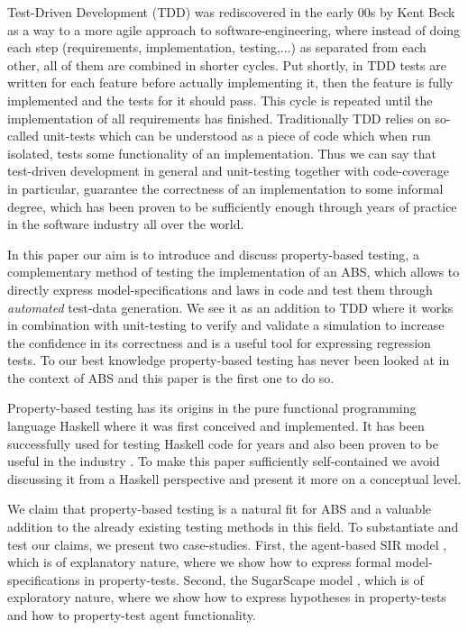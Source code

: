 Test-Driven Development (TDD) was rediscovered in the early 00s by Kent Beck \cite{beck_test_2002} as a way to a more agile approach to software-engineering, where instead of doing each step (requirements, implementation, testing,...) as separated from each other, all of them are combined in shorter cycles. Put shortly, in TDD tests are written for each feature before actually implementing it, then the feature is fully implemented and the tests for it should pass. This cycle is repeated until the implementation of all requirements has finished. Traditionally TDD relies on so-called unit-tests which can be understood as a piece of code which when run isolated, tests some functionality of an implementation. Thus we can say that test-driven development in general and unit-testing together with code-coverage in particular, guarantee the correctness of an implementation to some informal degree, which has been proven to be sufficiently enough through years of practice in the software industry all over the world. 

In this paper our aim is to introduce and discuss property-based testing, a complementary method of testing the implementation of an ABS, which allows to directly express model-specifications and laws in code and test them through \textit{automated} test-data generation. We see it as an addition to TDD where it works in combination with unit-testing to verify and validate a simulation to increase the confidence in its correctness and is a useful tool for expressing regression tests. To our best knowledge property-based testing has never been looked at in the context of ABS and this paper is the first one to do so.

Property-based testing has its origins \cite{claessen_quickcheck_2000,claessen_testing_2002,runciman_smallcheck_2008} in the pure functional programming language Haskell \cite{hudak_history_2007} where it was first conceived and implemented. It has been successfully used for testing Haskell code for years and also been proven to be useful in the industry \cite{hughes_quickcheck_2007}. To make this paper sufficiently self-contained we avoid discussing it from a Haskell perspective and present it more on a conceptual level. 

We claim that property-based testing is a natural fit for ABS and a valuable addition to the already existing testing methods in this field. To substantiate and test our claims, we present two case-studies. First, the agent-based SIR model \cite{macal_agent-based_2010}, which is of explanatory nature, where we show how to express formal model-specifications in property-tests. Second, the SugarScape model \cite{epstein_growing_1996}, which is of exploratory nature, where we show how to express hypotheses in property-tests and how to property-test agent functionality.

